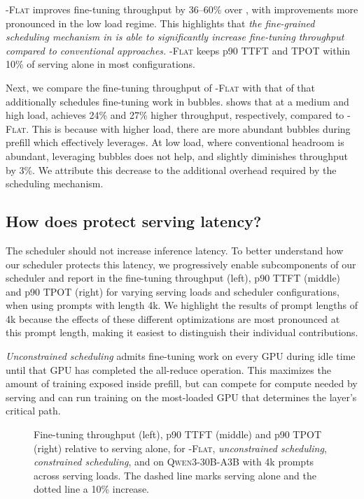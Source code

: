 \sys-\textsc{Flat} improves fine-tuning throughput by 36--60\% over \emph{\cfgColo}, with improvements more pronounced in the low load regime.
This highlights that \emph{the fine-grained scheduling mechanism in \sys is able to significantly increase fine-tuning throughput compared to conventional approaches.} \sys-\textsc{Flat} keeps p90 \ac{TTFT} and \ac{TPOT} within 10\% of serving alone in most configurations.

Next, we compare the fine-tuning throughput of \sys-\textsc{Flat} with that of \sys that additionally schedules fine-tuning work in bubbles.
 shows that at a medium and high load, \sys achieves 24\% and 27\% higher throughput, respectively, compared to \sys-\textsc{Flat}.
This is because with higher load, there are more abundant bubbles during prefill which \sys effectively leverages.
At low load, where conventional headroom is abundant, leveraging bubbles does not help, and slightly diminishes throughput by 3\%.
We attribute this decrease to the additional overhead required by the \sys scheduling mechanism.

\subsection{How does \sys protect serving latency?}
\label{sec:eval-latency}

The \sys scheduler should not increase inference latency.
To better understand how our scheduler protects this latency, we progressively enable subcomponents of our scheduler and report in  the fine-tuning throughput (left), p90 \ac{TTFT} (middle) and p90 \ac{TPOT} (right) for varying serving loads and scheduler configurations, when using prompts with length 4k.
We highlight the results of prompt lengths of 4k because the effects of these different optimizations are most pronounced at this prompt length, making it easiest to distinguish their individual contributions.

\emph{Unconstrained scheduling} admits fine-tuning work on every GPU during idle time until that GPU has completed the all-reduce operation.
This maximizes the amount of training exposed inside prefill, but can compete for compute needed by serving and can run training on the most-loaded GPU that determines the layer's critical path.

\begin{figure}[t]
  \centering
  \caption{Fine-tuning throughput (left), p90 \ac{TTFT} (middle) and p90 \ac{TPOT} (right) relative to serving alone, for \sys-\textsc{Flat}, \emph{unconstrained scheduling}, \emph{constrained scheduling}, and \sys on \textsc{Qwen3-30B-A3B} with 4k prompts across serving loads. The dashed line marks serving alone and the dotted line a 10\% increase.}
  \label{fig:eval-latency-ablation}
\end{figure}

